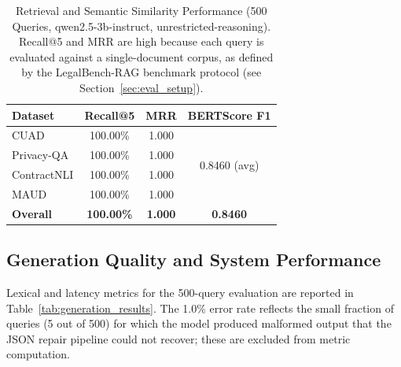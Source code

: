 \documentclass[conference]{IEEEtran}
\begin{document}
\begin{table}[!t]
\centering
\caption{Retrieval and Semantic Similarity Performance (500 Queries, qwen2.5-3b-instruct, unrestricted-reasoning). Recall@5 and MRR are high because each query is evaluated against a single-document corpus, as defined by the LegalBench-RAG benchmark protocol (see Section~\ref{sec:eval_setup}).}
\label{tab:retrieval_results}
\renewcommand{\arraystretch}{1.2}
\begin{tabular}{lccc}
\toprule
\textbf{Dataset} & \textbf{Recall@5} & \textbf{MRR} & \textbf{BERTScore F1} \\
\midrule
CUAD        & 100.00\% & 1.000 & \multirow{4}{*}{0.8460 (avg)} \\
Privacy-QA  & 100.00\% & 1.000 & \\
ContractNLI & 100.00\% & 1.000 & \\
MAUD        & 100.00\% & 1.000 & \\
\midrule
\textbf{Overall} & \textbf{100.00\%} & \textbf{1.000} & \textbf{0.8460} \\
\bottomrule
\end{tabular}
\end{table}

\subsection{Generation Quality and System Performance}
\label{sec:generation_results}

Lexical and latency metrics for the 500-query evaluation are reported in Table~\ref{tab:generation_results}. The 1.0\% error rate reflects the small fraction of queries (5 out of 500) for which the model produced malformed output that the JSON repair pipeline could not recover; these are excluded from metric computation.

\begin{table}[!t]
\centering
\caption{Generation Quality and Latency (500 Queries, qwen2.5-3b-instruct, unrestricted-reasoning, local CPU). Corpus-level BLEU and chrF are computed over the full valid response set. Token F1 is the macro-average over individual query pairs.}
\label{tab:generation_results}
\renewcommand{\arraystretch}{1.2}
\end{table}
\end{document}
